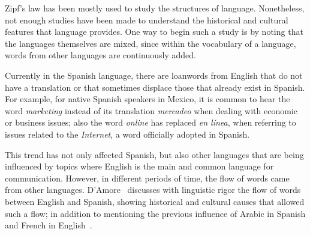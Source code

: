 \documentclass[10pt,letterpaper]{article} %
\begin{document}

Zipf's law has been mostly used to study the structures of language.
Nonetheless, not enough studies have been made to understand the historical and
cultural features that language provides. One way to begin such a study is by
noting that the languages themselves are mixed, since within the vocabulary of
a language, words from other languages are continuously added.


Currently in the Spanish language, there are loanwords from English 
that do not have a translation or that sometimes displace those that already
exist in Spanish.  For example, for native Spanish speakers in Mexico, it is common to
hear the word \textit{marketing} instead of its translation \textit{mercadeo}
when dealing with economic or business issues; also the word \textit{online}
has replaced \textit{en línea}, when referring to issues related to the
\textit{Internet}, a word officially adopted in Spanish.

This trend has not only affected Spanish,  but also other languages that are
being influenced by topics where English is the main and common language for
communication. However, in different periods of time, the flow of words came
from other languages. D’Amore~\cite{Damore_influencia_mutua} discusses with linguistic rigor the
flow of words between English and Spanish,  showing historical  and cultural
causes that allowed such a flow; in addition to mentioning the previous influence of
Arabic in Spanish and French in
English~\cite{gorlach2005dictionary,haspelmath2009loanwords,durkin2014borrowed}. 
\end{document}
